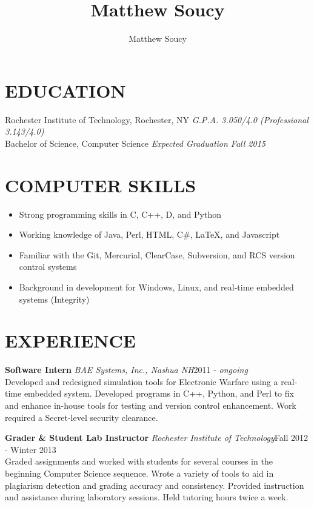 \documentclass[line]{res}
\author{Matthew Soucy}
\title{Matthew Soucy}
\newcommand{\job}[3]{{\bf #1} {\it #2}\hfill #3\\}
\begin{document}
\setlength{\textheight}{11.5in} %
\address{\large
	2433 Nathaniel Rochester Hall \\
	Rochester, NY 14623 \\
	(585) 204-7402
}
\address{\it
	msoucy@csh.rit.edu \\
	http://msoucy.me/ \\
	http://linkedin.com/in/msoucy
}

\begin{resume}

\section{EDUCATION}

	Rochester Institute of Technology, Rochester, NY
	\hfill
	\textit{G.P.A. 3.050/4.0 (Professional 3.143/4.0)} \\
	Bachelor of Science, Computer Science
	\hfill
	\textit{Expected Graduation Fall 2015}

\section{COMPUTER SKILLS}

	\begin{itemize}[leftmargin=10pt]
	\item Strong programming skills in C, C++, D, and Python
	\item Working knowledge of Java, Perl, HTML, C\#, \LaTeX, and Javascript
	\item Familiar with the Git, Mercurial, ClearCase, Subversion, and RCS version control systems
	\item Background in development for Windows, Linux, and real-time embedded systems (Integrity)
	\end{itemize}

\section{EXPERIENCE}

	\job{Software Intern}{BAE Systems, Inc., Nashua NH}{2011 - \textit{ongoing}}
	Developed and redesigned simulation tools for Electronic Warfare using a real-time embedded system.
	Developed programs in C++, Python, and Perl to fix and enhance in-house tools for testing and version control enhancement.
	Work required a Secret-level security clearance.

	\job{Grader \& Student Lab Instructor}{Rochester Institute of Technology}{Fall 2012 - Winter 2013}
	Graded assignments and worked with students for several courses in the beginning Computer Science sequence.
	Wrote a variety of tools to aid in plagiarism detection and grading accuracy and consistency.
	Provided instruction and assistance during laboratory sessions.
	Held tutoring hours twice a week.


\end{resume}
\end{document}
